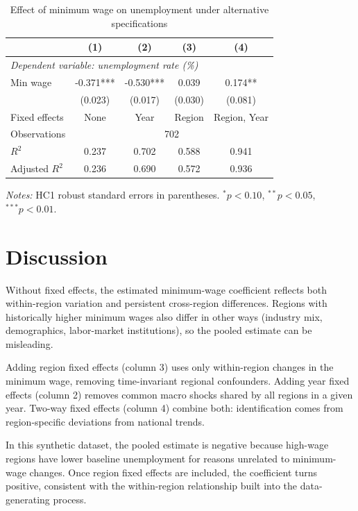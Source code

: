 \documentclass[12pt]{article}
\begin{document}
\begin{table}[htbp]
\centering
\caption{Effect of minimum wage on unemployment under alternative specifications}
\label{tab:fe_results}
\begin{tabular}{lcccc}
\toprule
 & (1) & (2) & (3) & (4) \\
\midrule
\multicolumn{5}{l}{\textit{Dependent variable: unemployment rate (\%)}} \\
\addlinespace
Min wage & -0.371*** & -0.530*** & 0.039 & 0.174** \\
 & (0.023) & (0.017) & (0.030) & (0.081) \\
\addlinespace
Fixed effects & None & Year & Region & Region, Year \\
Observations & \multicolumn{4}{c}{702} \\
$R^2$ & 0.237 & 0.702 & 0.588 & 0.941 \\
Adjusted $R^2$ & 0.236 & 0.690 & 0.572 & 0.936 \\
\bottomrule
\end{tabular}

\medskip
\footnotesize
\textit{Notes:} HC1 robust standard errors in parentheses.
$^{*}p<0.10$, $^{**}p<0.05$, $^{***}p<0.01$.
\end{table}

\section{Discussion}

Without fixed effects, the estimated minimum-wage coefficient reflects both
within-region variation and persistent cross-region differences. Regions with
historically higher minimum wages also differ in other ways (industry mix,
demographics, labor-market institutions), so the pooled estimate can be
misleading.

Adding region fixed effects (column 3) uses only within-region changes in the
minimum wage, removing time-invariant regional confounders. Adding year fixed
effects (column 2) removes common macro shocks shared by all regions in a given
year. Two-way fixed effects (column 4) combine both: identification comes from
region-specific deviations from national trends.

In this synthetic dataset, the pooled estimate is negative because high-wage
regions have lower baseline unemployment for reasons unrelated to minimum-wage
changes. Once region fixed effects are included, the coefficient turns positive,
consistent with the within-region relationship built into the data-generating
process.
\end{document}
